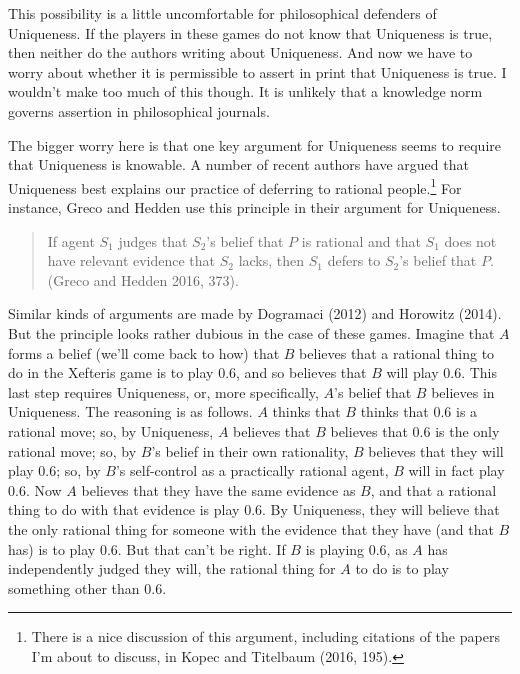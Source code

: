 \documentclass[
  11pt,
]{article}
\begin{document}
This possibility is a little uncomfortable for philosophical defenders of Uniqueness. If the players in these games do not know that Uniqueness is true, then neither do the authors writing about Uniqueness. And now we have to worry about whether it is permissible to assert in print that Uniqueness is true. I wouldn't make too much of this though. It is unlikely that a knowledge norm governs assertion in philosophical journals.

The bigger worry here is that one key argument for Uniqueness seems to require that Uniqueness is knowable. A number of recent authors have argued that Uniqueness best explains our practice of deferring to rational people.\footnote{There is a nice discussion of this argument, including citations of the papers I'm about to discuss, in Kopec and Titelbaum (2016, 195).} For instance, Greco and Hedden use this principle in their argument for Uniqueness.

\begin{quote}
If agent \(S_1\) judges that \(S_2\)'s belief that \(P\) is rational and that \(S_1\) does not have relevant evidence that \(S_2\) lacks, then \(S_1\) defers to \(S_2\)'s belief that \(P\). (Greco and Hedden 2016, 373).
\end{quote}

Similar kinds of arguments are made by Dogramaci (2012) and Horowitz (2014). But the principle looks rather dubious in the case of these games. Imagine that \(A\) forms a belief (we'll come back to how) that \(B\) believes that a rational thing to do in the Xefteris game is to play 0.6, and so believes that \(B\) will play 0.6. This last step requires Uniqueness, or, more specifically, \(A\)'s belief that \(B\) believes in Uniqueness. The reasoning is as follows. \(A\) thinks that \(B\) thinks that 0.6 is a rational move; so, by Uniqueness, \(A\) believes that \(B\) believes that 0.6 is the only rational move; so, by \(B\)'s belief in their own rationality, \(B\) believes that they will play 0.6; so, by \(B\)'s self-control as a practically rational agent, \(B\) will in fact play 0.6. Now \(A\) believes that they have the same evidence as \(B\), and that a rational thing to do with that evidence is play 0.6. By Uniqueness, they will believe that the only rational thing for someone with the evidence that they have (and that \(B\) has) is to play 0.6. But that can't be right. If \(B\) is playing 0.6, as \(A\) has independently judged they will, the rational thing for \(A\) to do is to play something other than 0.6.
\end{document}
